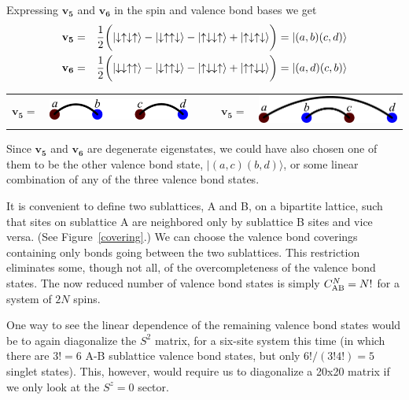 Expressing $\mathbf{v_5}$ and $\mathbf{v_6}$ in the spin and valence bond bases we get
\begin{eqnarray}
\mathbf{v_5} &=&\frac{1}{2}\bigg(\lvert \downarrow \uparrow \downarrow \uparrow \rangle - \lvert \downarrow \uparrow \uparrow \downarrow \rangle
			- \lvert \uparrow \downarrow \downarrow \uparrow \rangle + \lvert \uparrow \downarrow \uparrow \downarrow \rangle \bigg) 
			= \lvert(a,b)(c,d)\rangle \label{state5}\\
\mathbf{v_6} &=&\frac{1}{2}\bigg(\lvert \downarrow \downarrow \uparrow \uparrow \rangle - \lvert \downarrow \uparrow \uparrow \downarrow \rangle
			- \lvert \uparrow \downarrow \downarrow \uparrow \rangle + \lvert \uparrow \uparrow \downarrow \downarrow \rangle \bigg)
			= \lvert(a,d)(c,b)\rangle \label{state6}
\end{eqnarray}
\begin{center}
\begin{tabular}{ccccc}
$\mathbf{v_5} =$ &  \includegraphics [width=2in]{./figures/made/state5.pdf} &\;\;\;\;\;\;\,\,\,\,\,\,
& $\mathbf{v_5} =$ &  \includegraphics [width=2in]{./figures/made/state6.pdf} 
\end{tabular}
\end{center}
Since $\mathbf{v_5}$ and  $\mathbf{v_6}$ are degenerate eigenstates, we could have also chosen one of them to be the other valence bond state, $\lvert(a,c)(b,d)\rangle$, or some linear combination of any of the three valence bond states.

It is convenient to define two sublattices, A and B, on a bipartite lattice, such that sites on 
sublattice A are neighbored only by sublattice B sites and vice versa. (See Figure~\ref{covering}.)
We can choose the valence bond coverings containing only bonds going between the two sublattices.
This restriction eliminates some, though not all, of the overcompleteness of the valence bond states.
The now reduced number of valence bond states is simply $C_{\rm{AB}}^N = N!$ for a system of $2N$ spins.

One way to see the linear dependence of the remaining valence bond states would be to again diagonalize
the $S^2$ matrix, for a six-site system this time (in which there are $3!=6$ A-B sublattice
valence bond states, but only $6!/(3!4!) = 5$ singlet states).
This, however, would require us to diagonalize a 20x20 matrix if we only look at
the $S^z=0$ sector.

